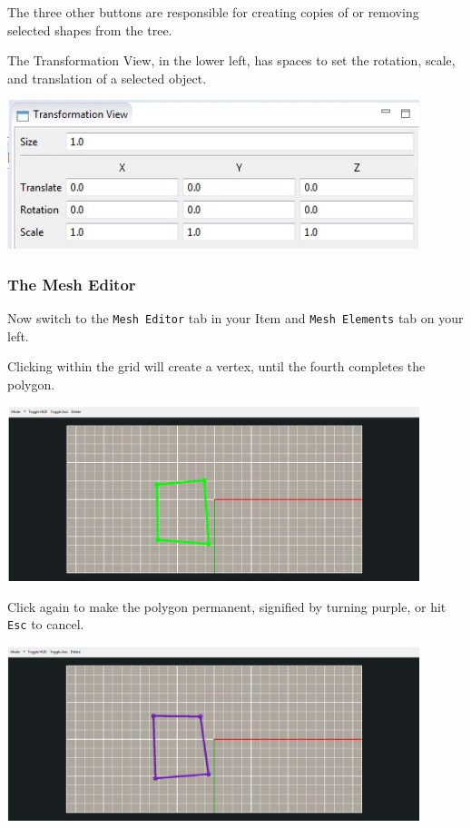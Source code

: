 The three other buttons are responsible for creating copies of or removing
selected shapes from the tree. 

The Transformation View, in the lower left, has spaces to set the rotation, scale, 
and translation of a selected object.

\begin{center}
\includegraphics[width=12cm]{images/TransformationView}
\end{center}

\subsubsection{The Mesh Editor}

Now switch to the \texttt{Mesh Editor} tab in your Item and \texttt{Mesh
Elements} tab on your left.

Clicking within the grid will create a vertex, until the fourth completes the
polygon.

\begin{center}
\includegraphics[width=12cm]{images/AddPolygon}
\end{center}

Click again to make the polygon permanent, signified by turning purple, or hit
\texttt{Esc} to cancel.

\begin{center}
\includegraphics[width=12cm]{images/NewPolygon}
\end{center}

